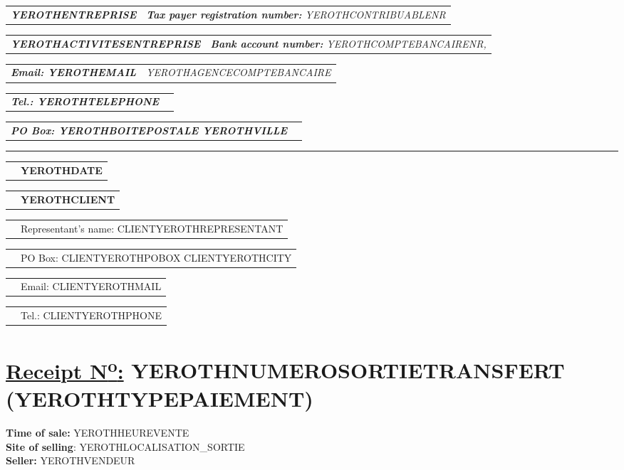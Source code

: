 \documentclass[11pt,YEROTHPAPERSPEC]{article} %
\makeatletter
\newcommand{\headerrow}[2]
{\begin{tabular*}{\linewidth}{l@{\extracolsep{\fill}}r}
	#1 &
	#2 \\
\end{tabular*}}
\newcommand{\emphbold}[1]{\textbf{\emph{#1}}\xspace}
\makeatother
\begin{document}
\bigskip

\headerrow
	{\emphbold{YEROTHENTREPRISE}}
	{\emph{\textbf{Tax payer registration number:} YEROTHCONTRIBUABLENR}}
\headerrow
	{\emphbold{YEROTHACTIVITESENTREPRISE}}
	{\emph{\textbf{Bank account number:} YEROTHCOMPTEBANCAIRENR,}}
\headerrow
	{\emphbold{Email: YEROTHEMAIL}}
	{\emph{YEROTHAGENCECOMPTEBANCAIRE}}
\headerrow
	{\emphbold{Tel.: YEROTHTELEPHONE}}
	{}
\headerrow
	{\emphbold{PO Box: YEROTHBOITEPOSTALE YEROTHVILLE}}
	{}
	
\hrule

\headerrow
	{}
	{\textbf{YEROTHDATE}}

\vspace*{0.9cm}

\headerrow
{}
{\textbf{YEROTHCLIENT}}
\headerrow
{}
{Representant's name: CLIENTYEROTHREPRESENTANT}
\headerrow
{}
{PO Box: CLIENTYEROTHPOBOX CLIENTYEROTHCITY}
\headerrow
{}
{Email: CLIENTYEROTHMAIL}
\headerrow
{}
{Tel.: CLIENTYEROTHPHONE}

\section*{\underline{Receipt N\textsuperscript{o}:} YEROTHNUMEROSORTIETRANSFERT (YEROTHTYPEPAIEMENT)}
\textbf{Time of sale:} YEROTHHEUREVENTE\\
\textbf{Site of selling}: YEROTHLOCALISATION_SORTIE\\
\textbf{Seller:} YEROTHVENDEUR

\vspace{0.3cm} 
\end{document}
